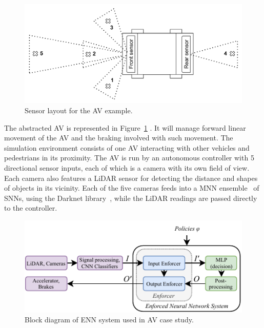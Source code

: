 \begin{figure}[h]
	\centering
	\includegraphics[scale=0.24,trim={0 7mm 0 7mm},clip ]{Content/fig/AV.pdf}
	\caption{Sensor layout for the \ac{AV} example. \label{fig:av}}
\end{figure}
\vspace{1em}
The abstracted \acf{AV} is represented in Figure~\ref{fig:av} .
It will manage forward linear movement of the \ac{AV} and the braking involved with such movement.
The simulation environment consists of one \ac{AV} interacting with other vehicles and pedestrians in its proximity.
The \ac{AV} is run by an autonomous controller with 5 directional sensor inputs, each of which is a camera with its own field of view.
Each camera also features a \acf{LiDAR} sensor for detecting the
distance and shapes of objects in its vicinity.
Each of the five cameras feeds into a \acf{MNN} ensemble~\cite{Maqsood2004} of \acp{SNN}, using the Darknet library~\cite{darknet13}, while the \ac{LiDAR} readings are passed directly to the controller.
\begin{figure}[b]
	\centering
	\includegraphics[width = \textwidth]{Content/fig/model-driven-ai-av-example.pdf}
	\caption{Block diagram of \ac{ENN} system used in \ac{AV} case study. \label{fig:avnenf}}
	\vspace{-4mm}
\end{figure}

